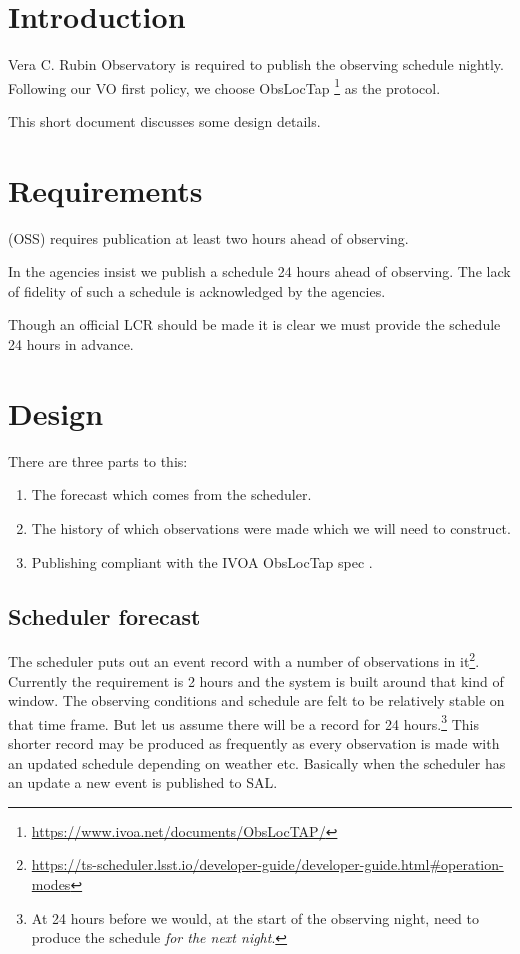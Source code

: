 \def\DB{ObsLocTAP database }

\section{Introduction}
Vera C. Rubin Observatory is required to publish the observing schedule nightly. Following our VO first policy, we  choose ObsLocTap \citep{2021ivoa.spec.0724S} \footnote{\url{https://www.ivoa.net/documents/ObsLocTAP/}} as the protocol.

This short document discusses some design details.

\section{Requirements}

 (OSS) requires publication at least two hours ahead of observing.

In  the agencies insist we publish a schedule 24 hours ahead of observing.
The lack of fidelity of such a schedule is acknowledged by the agencies.

Though an official LCR should be made it is clear we must provide the schedule 24 hours in advance.

\section{Design}


There are three parts to this:


\begin{enumerate}
\item The forecast  which comes from the scheduler.
\item The history of which observations were made which we will need to construct.
\item Publishing compliant with the IVOA ObsLocTap  spec \citep{2021ivoa.spec.0724S}.
\end{enumerate}

\subsection{Scheduler forecast} \label{sec:forecast}
The scheduler puts out an event record with a number of observations in it\footnote{\url{https://ts-scheduler.lsst.io/developer-guide/developer-guide.html\#operation-modes}}.
Currently the requirement is 2 hours and the system is built around that kind of window.
The observing conditions and schedule are felt to be relatively stable on that time frame.
But let us assume there will be  a record for 24 hours.\footnote{
At 24 hours before we would, at the start of the observing night, need to produce the schedule  \emph{for the next night}.
}
This shorter record may be produced as frequently as every observation is made with an updated schedule depending on weather etc.
Basically when the scheduler has an update a new event is published to SAL.

